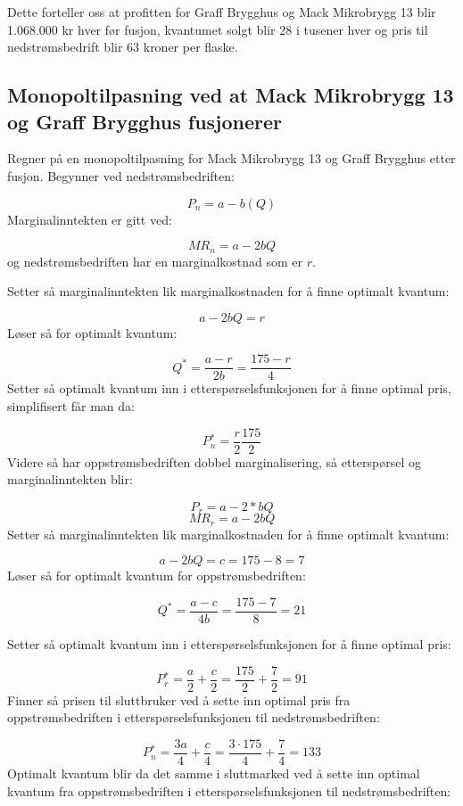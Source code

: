 \documentclass[
  12pt,
  a4paper,
  DIV=11,
  numbers=noendperiod]{scrartcl}
\begin{document}
Dette forteller oss at profitten for Graff Brygghus og Mack Mikrobrygg
13 blir 1.068.000 kr hver før fusjon, kvantumet solgt blir 28 i tusener
hver og pris til nedstrømsbedrift blir 63 kroner per flaske.

\clearpage

\subsection{Monopoltilpasning ved at Mack Mikrobrygg 13 og Graff
Brygghus
fusjonerer}\label{monopoltilpasning-ved-at-mack-mikrobrygg-13-og-graff-brygghus-fusjonerer}

Regner på en monopoltilpasning for Mack Mikrobrygg 13 og Graff Brygghus
etter fusjon. Begynner ved nedstrømsbedriften:

\[P_n = a − b(Q) \tag{45}\] Marginalinntekten er gitt ved:

\[MR_n = a - 2bQ \tag{46}\] og nedstrømsbedriften har en marginalkostnad
som er \(r\).

Setter så marginalinntekten lik marginalkostnaden for å finne optimalt
kvantum:

\[a - 2bQ = r \tag{47}\] Løser så for optimalt kvantum:

\[Q^* = \frac{a - r}{2b} = \frac{175 - r}{4} \tag{48}\] Setter så
optimalt kvantum inn i etterspørselsfunksjonen for å finne optimal pris,
simplifisert får man da:

\[P{_n^*} = \frac{r}{2} \frac{175}{2} \tag{49}\] Videre så har
oppstrømsbedriften dobbel marginalisering, så etterspørsel og
marginalinntekten blir:

\[P_r = a - 2*bQ \tag{50}\] \[MR_r = a - 2bQ \tag{51}\] Setter så
marginalinntekten lik marginalkostnaden for å finne optimalt kvantum:

\[a - 2bQ = c = 175 - 8 = 7\tag{52}\] Løser så for optimalt kvantum for
oppstrømsbedriften:

\[Q^* = \frac{a - c}{4b} = \frac{175 - 7}{8} = 21\tag{53}\]

Setter så optimalt kvantum inn i etterspørselsfunksjonen for å finne
optimal pris:

\[P{_r^*} = \frac{a}{2} + \frac{c}{2} = \frac{175}{2} + \frac{7}{2} = 91\tag{54}\]
Finner så prisen til sluttbruker ved å sette inn optimal pris fra
oppstrømsbedriften i etterspørselsfunksjonen til nedstrømsbedriften:

\[P{_n^*} = \frac{3a}{4} + \frac{c}{4} = \frac{3 \cdot 175}{4} + \frac{7}{4} = 133 \tag{55}\]
Optimalt kvantum blir da det samme i sluttmarked ved å sette inn optimal
kvantum fra oppstrømsbedriften i etterspørselsfunksjonen til
nedstrømsbedriften:
\end{document}
